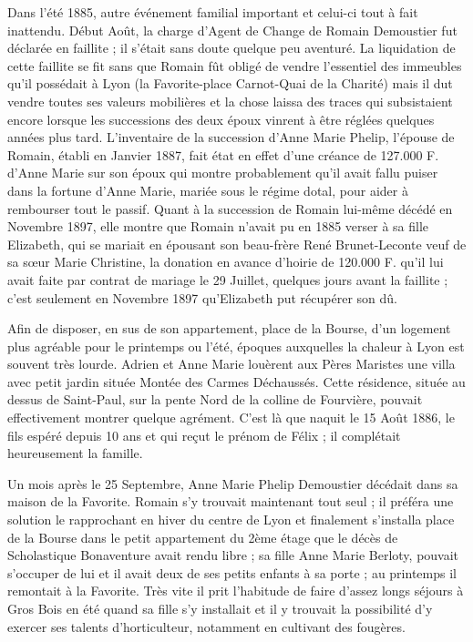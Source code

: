 \documentclass[11pt,a4paper]{report}
\begin{document}
Dans l'été 1885, autre événement familial important et celui-ci tout à fait inattendu. Début Août, la charge d'Agent de Change de Romain Demoustier fut déclarée en faillite ; il s'était sans doute quelque peu aventuré. La liquidation de cette faillite se fit sans que Romain fût obligé de vendre l'essentiel des immeubles qu'il possédait à Lyon (la Favorite-place Carnot-Quai de la Charité) mais il dut vendre toutes ses valeurs mobilières et la chose laissa des traces qui subsistaient encore lorsque les successions des deux époux vinrent à être réglées quelques années plus tard. L'inventaire de la succession d'Anne Marie Phelip, l'épouse de Romain, établi en Janvier 1887, fait état en effet d'une créance de 127.000 F. d'Anne Marie sur son époux qui montre probablement qu'il avait fallu puiser dans la fortune d'Anne Marie, mariée sous le régime dotal, pour aider à rembourser tout le passif. Quant à la succession de Romain lui-même décédé en Novembre 1897, elle montre que Romain n'avait pu en 1885 verser à sa fille Elizabeth, qui se mariait en épousant son beau-frère René Brunet-Leconte veuf de sa sœur Marie Christine, la donation en avance d'hoirie de 120.000 F. qu'il lui avait faite par contrat de mariage le 29 Juillet, quelques jours avant la faillite ; c'est seulement en Novembre 1897 qu'Elizabeth put récupérer son dû.

Afin de disposer, en sus de son appartement, place de la Bourse, d'un logement plus agréable pour le printemps ou l'été, époques auxquelles la chaleur à Lyon est souvent très lourde. Adrien et Anne Marie louèrent aux Pères Maristes une villa avec petit jardin située Montée des Carmes Déchaussés. Cette résidence, située au dessus de Saint-Paul, sur la pente Nord de la colline de Fourvière, pouvait effectivement montrer quelque agrément. C'est là que naquit le 15 Août 1886, le fils espéré depuis 10 ans et qui reçut le prénom de Félix ; il complétait heureusement la famille.


Un mois après le 25 Septembre, Anne Marie Phelip Demoustier décédait dans sa maison de la Favorite. Romain s'y trouvait maintenant tout seul ; il préféra une solution le rapprochant en hiver du centre de Lyon et finalement s'installa place de la Bourse dans le petit appartement du 2ème étage que le décès de Scholastique Bonaventure avait rendu libre ; sa fille Anne Marie Berloty, pouvait s'occuper de lui et il avait deux de ses petits enfants à sa porte ; au printemps il remontait à la Favorite. Très vite il prit l'habitude de faire d'assez longs séjours à Gros Bois en été quand sa fille s'y installait et il y trouvait la possibilité d'y exercer ses talents d'horticulteur, notamment en cultivant des fougères.
\end{document}
